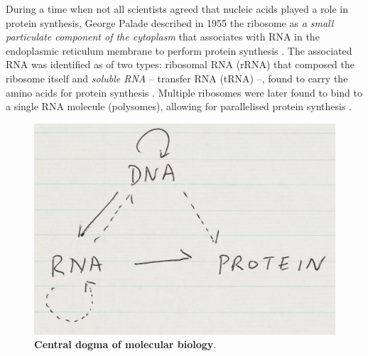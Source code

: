 During a time when not all scientists agreed that nucleic acids played a role in protein synthesis, George Palade described in 1955 the ribosome as \emph{a small particulate component of the cytoplasm} that associates with RNA in the endoplasmic reticulum membrane to perform protein synthesis \cite{palade:1955tf,jacob:1961uh}. The associated RNA was identified as of two types: ribosomal RNA (rRNA) that composed the ribosome itself and \emph{soluble RNA} -- transfer RNA (tRNA) --, found to carry the amino acids for protein synthesis \cite{hoagland:1958vm,jacob:1961uh}. Multiple ribosomes were later found to bind to a single RNA molecule (polysomes), allowing for parallelised protein synthesis \cite{warner:1963uj}.

\begin{figure}
  \vspace{-\intextsep}
  \includegraphics[width=\linewidth]{images/intro/crick-central-dogma cropped}
  \caption[Central dogma of molecular biology]{\textbf{Central dogma of molecular biology}.}
  \label{fig:central-dogma}
  \vspace{-\intextsep}
\end{figure}

